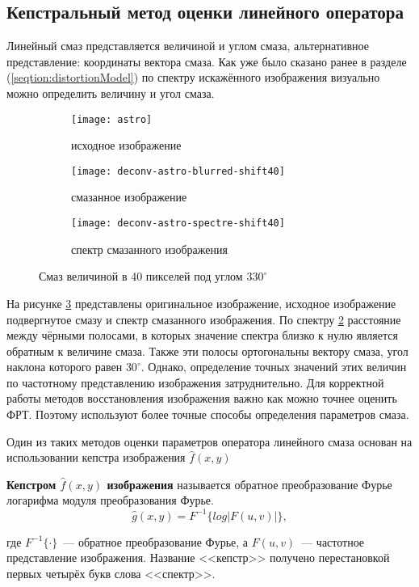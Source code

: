 \subsection{Кепстральный метод оценки линейного оператора}
Линейный смаз представляется величиной и углом смаза, альтернативное представление: координаты вектора смаза. 
Как уже было сказано ранее в разделе (\ref{seqtion:distortionModel}) по спектру искажённого изображения визуально можно определить величину и угол смаза.
\begin{figure}[h!]
	\begin{subfigure}[t]{0.3\textwidth}
		\texttt{[image: astro]}
		\caption{исходное изображение}
	\end{subfigure}%
	\begin{subfigure}[t]{0.3\textwidth}
		\texttt{[image: deconv-astro-blurred-shift40]}
		\caption{смазанное изображение}
		\label{fig:astroShift40}
	\end{subfigure}%
	\begin{subfigure}[t]{0.3\textwidth}
		\texttt{[image: deconv-astro-spectre-shift40]}
		\caption{спектр смазанного изображения}
		\label{fig:astroShift40Spectre}
	\end{subfigure}
	\caption{Смаз величиной в 40 пикселей под углом $330^{\circ}$}
	\label{fig:spectre}
\end{figure}
На рисунке \ref{fig:spectre} представлены оригинальное изображение, исходное изображение подвергнутое смазу и спектр смазанного изображения. По спектру \ref{fig:astroShift40Spectre} расстояние между чёрными полосами, в которых значение спектра близко к нулю является обратным к величине смаза. Также эти полосы ортогональны вектору смаза, угол наклона которого равен $30^\circ$. Однако, определение точных значений этих величин по частотному представлению изображения затруднительно. Для корректной работы методов восстановления изображения важно как можно точнее оценить ФРТ. Поэтому используют более точные способы определения параметров смаза.

Один из таких методов оценки параметров оператора линейного смаза основан на использовании кепстра изображения $\hat{f}(x,y)$~\cite{iterableImageRestorationBiemonLangdeik}
\begin{definition}\label{def:kepstr}
	\textbf{Кепстром $\hat{f}(x,y)$ изображения} называется обратное преобразование Фурье логарифма модуля преобразования Фурье.
	\begin{equation}
	\hat{g}(x,y) = F^{-1}\{log|F(u,v)|\},
	\end{equation}
\end{definition}
где $F^{-1}\{\cdot\}$~--- обратное преобразование Фурье, а $F(u,v)$~--- частотное представление изображения. Название <<кепстр>> получено перестановкой первых четырёх букв слова <<спектр>>.

